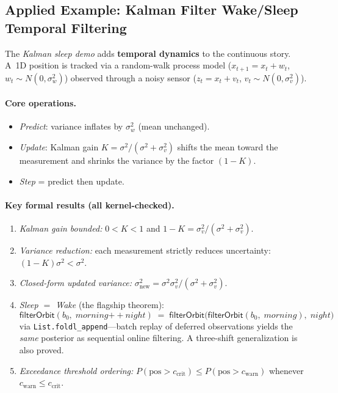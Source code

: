 \documentclass[11pt,openany]{report}
\begin{document}
\subsection{Applied Example: Kalman Filter Wake/Sleep Temporal Filtering}

The \emph{Kalman sleep demo} adds \textbf{temporal dynamics} to the
continuous story.  A~1D position is tracked via a random-walk process
model ($x_{t+1} = x_t + w_t$, $w_t \sim N(0,\sigma_w^2)$) observed
through a noisy sensor ($z_t = x_t + v_t$, $v_t \sim N(0,\sigma_v^2)$).

\paragraph{Core operations.}
\begin{itemize}
\item \emph{Predict}: variance inflates by $\sigma_w^2$ (mean unchanged).
\item \emph{Update}: Kalman gain $K = \sigma^2/(\sigma^2 + \sigma_v^2)$
  shifts the mean toward the measurement and shrinks the variance by
  the factor $(1-K)$.
\item \emph{Step} = predict then update.
\end{itemize}

\paragraph{Key formal results (all kernel-checked).}
\begin{enumerate}
\item \emph{Kalman gain bounded:} $0 < K < 1$ and $1-K = \sigma_v^2/(\sigma^2+\sigma_v^2)$.
\item \emph{Variance reduction:} each measurement strictly reduces
  uncertainty: $(1-K)\sigma^2 < \sigma^2$.
\item \emph{Closed-form updated variance:}
  $\sigma^2_{\mathrm{new}} = \sigma^2 \sigma_v^2 / (\sigma^2 + \sigma_v^2)$.
\item \emph{Sleep $=$ Wake} (the flagship theorem):
  \[
    \mathsf{filterOrbit}(b_0,\; \mathit{morning} \mathbin{+\!+} \mathit{night})
    \;=\;
    \mathsf{filterOrbit}\bigl(\mathsf{filterOrbit}(b_0,\;\mathit{morning}),\;
      \mathit{night}\bigr)
  \]
  via \texttt{List.foldl\_append}---batch replay of deferred
  observations yields the \emph{same} posterior as sequential online
  filtering.  A three-shift generalization is also proved.
\item \emph{Exceedance threshold ordering:}
  $P(\text{pos} > c_{\mathrm{crit}}) \le P(\text{pos} > c_{\mathrm{warn}})$
  whenever $c_{\mathrm{warn}} \le c_{\mathrm{crit}}$.
\end{enumerate}
\end{document}
